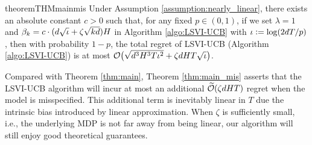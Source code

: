 


 
 





\begin{restatable}{theorem}{THMmainmis} \label{thm:main_mis}
Under Assumption \ref{assumption:nearly_linear}, there 
exists an absolute constant $c >0$ such that,  for any fixed $p \in (0, 1)$, if we set $\lambda = 1$ and  $\beta_k  =  c \cdot (d\sqrt{\iota} + \zeta\sqrt{kd})H $ in Algorithm \ref{algo:LSVI-UCB} with $\iota \mathrel{\mathop:}= \log (2dT/p)$,   
then with probability $1-p$, the total regret of LSVI-UCB (Algorithm \ref{algo:LSVI-UCB}) is at most $\mathcal{O} \bigl ( \sqrt{d^3 H^3 T\iota^2} + \zeta dHT\sqrt{\iota} \bigr )$. 
\end{restatable}


Compared with Theorem \ref{thm:main}, Theorem \ref{thm:main_mis} asserts that the LSVI-UCB algorithm will incur at most an additional $\widetilde{\mathcal{O}}(\zeta dHT)$ regret when the model is misspecified. This additional term is inevitably linear in $T$ due the intrinsic bias introduced by linear approximation. When $\zeta$ is sufficiently small, i.e., the underlying MDP is not far away from being linear, our algorithm will still enjoy good theoretical guarantees.

